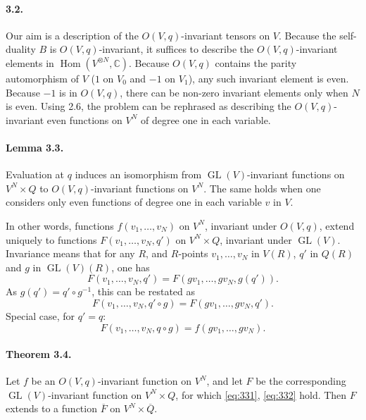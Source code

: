\documentclass[11pt]{article}
\newcommand{\C}{\mathbb C}
\newcommand{\Hom}{\operatorname{Hom}}
\newcommand{\GL}{\operatorname{GL}}
\newcommand{\barQ}{\overline Q}
\begin{document}
\paragraph{3.2.}
Our aim is a description of the $O(V,q)$-invariant tensors on $V$. Because the self-duality $B$ is $O(V,q)$-invariant, it suffices to describe the $O(V,q)$-invariant elements in $\Hom(V^{\otimes N},\C)$. Because $O(V,q)$ contains the parity automorphism of $V$ ($1$ on $V_0$ and $-1$ on $V_1$), any such invariant element is even. Because $-1$ is in $O(V,q)$, there can be non-zero invariant elements only when $N$ is even. Using 2.6, the problem can be rephrased as describing the $O(V,q)$-invariant even functions on $V^N$ of degree one in each variable.

\paragraph{Lemma 3.3.}
Evaluation at $q$ induces an isomorphism from $\GL(V)$-invariant functions on $V^N\times Q$ to $O(V,q)$-invariant functions on $V^N$. The same holds when one considers only even functions of degree one in each variable $v$ in $V$.

In other words, functions $f(v_1,\ldots,v_N)$ on $V^N$, invariant under $O(V,q)$, extend uniquely to functions $F(v_1,\ldots,v_N,q')$ on $V^N\times Q$, invariant under $\GL(V)$. Invariance means that for any $R$, and $R$-points $v_1,\ldots,v_N$ in $V(R)$, $q'$ in $Q(R)$ and $g$ in $\GL(V)(R)$, one has
\[
F(v_1,\ldots,v_N,q')=F(gv_1,\ldots,gv_N,g(q')).
\]
As $g(q')=q'\circ g^{-1}$, this can be restated as
\begin{equation}
\label{eq:331}
F(v_1,\ldots,v_N,q'\circ g)=F(gv_1,\ldots,gv_N,q').
\end{equation}
Special case, for $q'=q$:
\begin{equation}
\label{eq:332}
F(v_1,\ldots,v_N,q\circ g)=f(gv_1,\ldots,gv_N).
\end{equation}

\paragraph{Theorem 3.4.}
Let $f$ be an $O(V,q)$-invariant function on $V^N$, and let $F$ be the corresponding $\GL(V)$-invariant function on $V^N\times Q$, for which \eqref{eq:331}, \eqref{eq:332} hold. Then $F$ extends to a function $\overline F$ on $V^N\times\barQ$.
\end{document}
